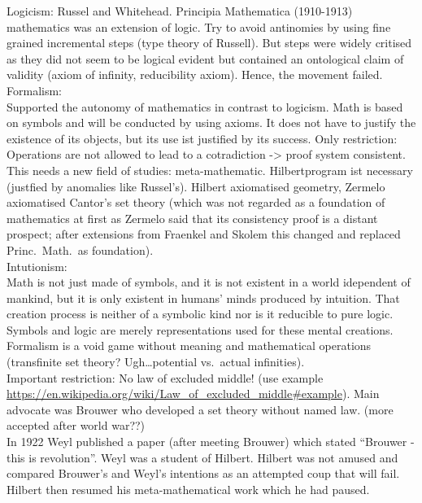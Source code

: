 \documentclass[hidelinks]{article}
\theoremstyle{plain}
\theoremstyle{definition}
\theoremstyle{rem}
\begin{document}
Logicism:
Russel and Whitehead. Principia Mathematica (1910-1913) mathematics was an extension of logic. Try to avoid antinomies by using fine grained incremental steps (type theory of Russell). But steps were widely critised as they did not seem to be logical evident but contained an ontological claim of validity (axiom of infinity, reducibility axiom). Hence, the movement failed.\\

Formalism:\\
Supported the autonomy of mathematics in contrast to logicism. Math is based on symbols and will be conducted by using axioms. It does not have to justify the existence of its objects, but its use ist justified by its success. Only restriction: Operations are not allowed to lead to a cotradiction -> proof system consistent. This needs a new field of studies: meta-mathematic. Hilbertprogram ist necessary (justfied by anomalies like Russel's). Hilbert axiomatised geometry, Zermelo axiomatised Cantor's set theory (which was not regarded as a foundation of mathematics at first as Zermelo said that its consistency proof is a distant prospect; after extensions from Fraenkel and Skolem this changed and replaced Princ.\ Math.\ as foundation).  \\

Intutionism:\\
Math is not just made of symbols, and it is not existent in a world idependent of mankind, but it is only existent in humans' minds produced by intuition. That creation process is neither of a symbolic kind nor is it reducible to pure logic. Symbols and logic are merely representations used for these mental creations. Formalism is a void game without meaning and mathematical operations (transfinite set theory? Ugh\ldots potential vs.\ actual infinities).\\
Important restriction: No law of excluded middle! (use example \url{https://en.wikipedia.org/wiki/Law\_of\_excluded\_middle#example}). Main advocate was Brouwer who developed a set theory without named law. (more accepted after world war??)\\

In 1922 Weyl published a paper (after meeting Brouwer) which stated ``Brouwer - this is revolution''. Weyl was a student of Hilbert. Hilbert was not amused and compared Brouwer's and Weyl's intentions as an attempted coup that will fail. Hilbert then resumed his meta-mathematical work which he had paused.\\
\end{document}
